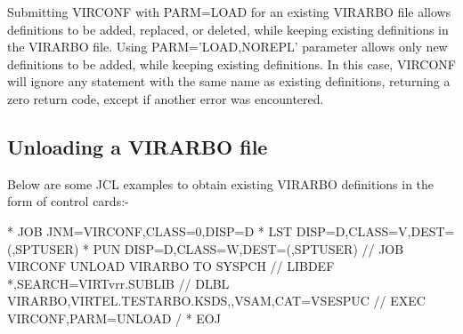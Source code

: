 \documentclass[letterpaper,10pt,english]{sphinxmanual}
\begin{document}

Submitting VIRCONF with PARM=LOAD for an existing VIRARBO file allows definitions to be added, replaced, or deleted, while keeping existing definitions in the VIRARBO file. Using PARM=’LOAD,NOREPL’ parameter allows only new definitions to be added, while keeping existing definitions. In this case, VIRCONF will ignore any statement with the same name as existing definitions, returning a zero return code, except if another error was encountered.

\ignorespaces 

\subsection{Unloading a VIRARBO file}
\label{\detokenize{Installation_Guide:unloading-a-virarbo-file}}\label{\detokenize{Installation_Guide:index-156}}
Below are some JCL examples to obtain existing VIRARBO definitions in the form of control cards:-

\begin{sphinxVerbatim}[commandchars=\\\{\}]
* \PYGZdl{}\PYGZdl{} JOB JNM=VIRCONF,CLASS=0,DISP=D
* \PYGZdl{}\PYGZdl{} LST DISP=D,CLASS=V,DEST=(,SPTUSER)
* \PYGZdl{}\PYGZdl{} PUN DISP=D,CLASS=W,DEST=(,SPTUSER)
// JOB VIRCONF UNLOAD VIRARBO TO SYSPCH
// LIBDEF *,SEARCH=VIRTvrr.SUBLIB
// DLBL VIRARBO,\PYGZsq{}VIRTEL.TESTARBO.KSDS\PYGZsq{},,VSAM,CAT=VSESPUC
// EXEC VIRCONF,PARM=\PYGZsq{}UNLOAD\PYGZsq{}
/\PYGZam{}
* \PYGZdl{}\PYGZdl{} EOJ
\end{sphinxVerbatim}

\end{document}
